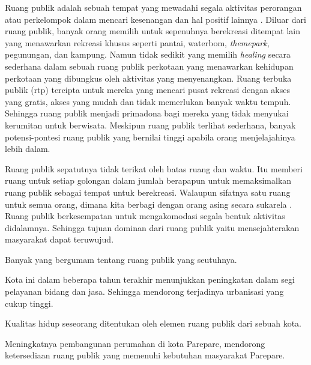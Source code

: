 \documentclass[11pt]{simart} %
\begin{document}
Ruang publik adalah sebuah tempat yang mewadahi segala aktivitas perorangan atau perkelompok dalam mencari kesenangan dan hal positif lainnya \citep{sadat2012}.
Diluar dari ruang publik, banyak orang memilih untuk sepenuhnya berekreasi ditempat lain yang menawarkan rekreasi khusus seperti pantai, waterbom, \textit{themepark}, pegunungan, dan kampung. Namun tidak sedikit yang memilih \textit{healing} secara sederhana dalam sebuah ruang publik perkotaan yang menawarkan kehidupan perkotaan yang dibungkus oleh aktivitas yang menyenangkan.
Ruang terbuka publik (rtp) tercipta untuk mereka yang mencari pusat rekreasi  dengan akses yang gratis, akses yang mudah dan tidak memerlukan banyak waktu tempuh. Sehingga ruang publik menjadi primadona bagi mereka yang tidak menyukai kerumitan untuk berwisata. Meskipun ruang publik terlihat sederhana, banyak potensi-pontesi ruang publik yang bernilai tinggi apabila orang menjelajahinya lebih dalam.

Ruang publik sepatutnya tidak terikat oleh batas ruang dan waktu. Itu memberi ruang untuk setiap golongan dalam jumlah berapapun untuk memaksimalkan ruang publik sebagai tempat untuk berekreasi. Walaupun sifatnya satu ruang untuk semua orang, dimana kita berbagi dengan orang asing secara sukarela \citep{sadat2012}. Ruang publik berkesempatan untuk mengakomodasi segala bentuk aktivitas didalamnya. Sehingga tujuan dominan dari ruang publik yaitu mensejahterakan masyarakat dapat teruwujud.

Banyak yang bergumam tentang ruang publik yang seutuhnya.






Kota ini dalam beberapa tahun terakhir menunjukkan peningkatan dalam segi pelayanan bidang dan jasa. Sehingga mendorong terjadinya urbanisasi yang cukup tinggi.

Kualitas hidup seseorang ditentukan oleh elemen ruang publik dari sebuah kota.


Meningkatnya pembangunan perumahan di kota Parepare, mendorong ketersediaan ruang publik yang memenuhi kebutuhan masyarakat Parepare.



\end{document}
